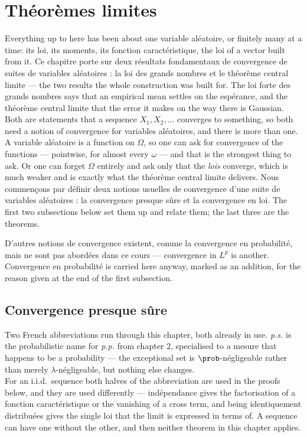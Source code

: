 \section{Théorèmes limites}
Everything up to here has been about one variable aléatoire, or finitely many at
a time: its loi, its moments, its fonction caractéristique, the loi of a vector
built from it. Ce chapitre porte sur deux résultats fondamentaux de convergence
de suites de variables aléatoires : la loi des grands nombres et le théorème
central limite --- the two results the whole construction was built for. The loi
forte des grands nombres says that an empirical mean settles on the espérance,
and the théorème central limite that the error it makes on the way there is
Gaussian.\\
Both are statements that a sequence $X_{1}, X_{2}, \dots$ converges to
something, so both need a notion of convergence for variables aléatoires, and
there is more than one. A variable aléatoire is a function on $\Omega$, so one
can ask for convergence of the functions --- pointwise, for almost every
$\omega$ --- and that is the strongest thing to ask. Or one can forget $\Omega$
entirely and ask only that the \emph{lois} converge, which is much weaker and is
exactly what the théorème central limite delivers. Nous commençons par définir
deux notions usuelles de convergence d'une suite de variables aléatoires : la
convergence presque sûre et la convergence en loi. The first two subsections
below set them up and relate them; the last three are the theorems.

\begin{remark}
  D'autres notions de convergence existent, comme la convergence en
  probabilité, mais ne sont pas abordées
  dans ce cours --- convergence in $L^{p}$ is another. Convergence en
  probabilité is carried here anyway, marked as an addition, for the reason
  given at the end of the first subsection.
\end{remark}

\subsection{Convergence presque sûre}
Two French abbreviations run through this chapter, both already in use.
\textit{p.s.} is the probabilistic name for \textit{p.p.} from chapter 2,
specialised to a mesure that happens to be a probability --- the exceptional
set is $\prob$-négligeable rather than merely $\lambda$-négligeable, but nothing
else changes.\\
For an i.i.d.\ sequence both halves of the abbreviation are used in the proofs
below, and they are used differently --- indépendance gives the factorisation of
a fonction caractéristique or the vanishing of a cross term, and being
identiquement distribuées gives the single loi that the limit is expressed in
terms of. A sequence can have one without the other, and then neither theorem in
this chapter applies.

